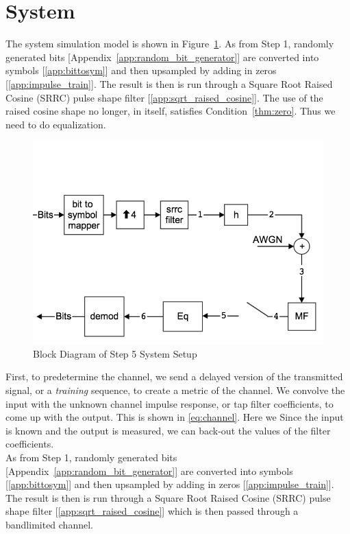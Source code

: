 \documentclass[]{article}
\begin{document}
\newpage
\section{System}
\label{sec:system}
The system simulation model is shown in Figure~\ref{fig:step5}.  As from Step 1, randomly generated bits [Appendix~\ref{app:random_bit_generator}] are converted into symbols [\ref{app:bittosym}] and then upsampled by adding in zeros [\ref{app:impulse_train}].  The result is then is run through a Square Root Raised Cosine (SRRC) pulse shape filter [\ref{app:sqrt_raised_cosine}].  The use of the raised cosine shape no longer, in itself, satisfies Condition~\ref{thm:zero}.  Thus we need to do equalization.\\

\begin{figure}[H]
\centering
\includegraphics[width=\textwidth]{step5.png}
\caption{Block Diagram of Step 5 System Setup\label{fig:step5}}
\end{figure}


First, to predetermine the channel, we send a delayed version of the transmitted signal, or a \emph{training} sequence, to create a metric of the channel.  We convolve the input with the unknown channel impulse response, or tap filter coefficients, to come up with the output.  This is shown in \ref{eq:channel}.  Here we  Since the input is known and the output is measured, we can back-out the values of the filter coefficients.  \\

As from Step 1, randomly generated bits [Appendix~\ref{app:random_bit_generator}] are converted into symbols [\ref{app:bittosym}] and then upsampled by adding in zeros [\ref{app:impulse_train}].  The result is then is run through a Square Root Raised Cosine (SRRC) pulse shape filter [\ref{app:sqrt_raised_cosine}] which is then passed through a bandlimited channel. 
\end{document}
